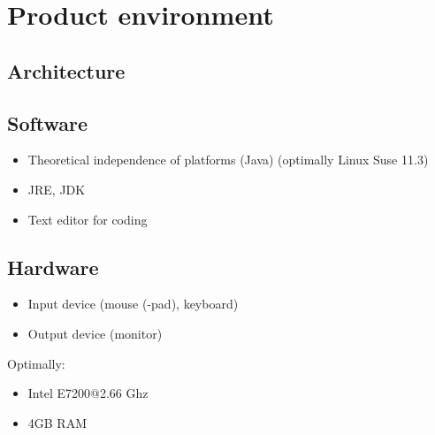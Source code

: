 \section{Product environment}

\subsection{Architecture} 

\subsection{Software}
\begin{itemize}
\item Theoretical independence of platforms (Java) (optimally Linux Suse 11.3)
\item JRE, JDK
\item Text editor for coding
\end{itemize}

\subsection{Hardware}
\begin{itemize}
\item Input device (mouse (-pad), keyboard)
\item Output device (monitor)
\end{itemize}
Optimally:
\begin{itemize}
\item Intel E7200@2.66 Ghz
\item 4GB RAM
\end{itemize}